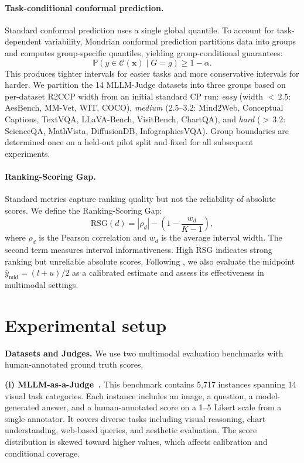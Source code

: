 \documentclass{article}
\begin{document}
\paragraph{Task-conditional conformal prediction.}
Standard conformal prediction uses a single global quantile. To account for task-dependent variability, Mondrian conformal prediction partitions data into groups and computes group-specific quantiles, yielding group-conditional guarantees:
\begin{equation}
\mathbb{P}(y \in \mathcal{C}(\mathbf{x}) \mid G = g) \geq 1 - \alpha.
\end{equation}
This produces tighter intervals for easier tasks and more conservative intervals for harder. We partition the 14 MLLM-Judge datasets into three groups based on per-dataset R2CCP width from an initial standard CP run: \emph{easy} (width ${<}\,2.5$: AesBench, MM-Vet, WIT, COCO), \emph{medium} ($2.5$--$3.2$: Mind2Web, Conceptual Captions, TextVQA, LLaVA-Bench, VisitBench, ChartQA), and \emph{hard} (${>}\,3.2$: ScienceQA, MathVista, DiffusionDB, InfographicsVQA). Group boundaries are determined once on a held-out pilot split and fixed for all subsequent experiments.

\paragraph{Ranking-Scoring Gap.}
Standard metrics capture ranking quality but not the reliability of absolute scores. We define the Ranking-Scoring Gap:
\begin{equation}
\text{RSG}(d) = |\rho_d| - \left(1 - \frac{w_d}{K - 1}\right),
\end{equation}
where $\rho_d$ is the Pearson correlation and $w_d$ is the average interval width. The second term measures interval informativeness. High RSG indicates strong ranking but unreliable absolute scores. Following \citet{sheng2025analyzing}, we also evaluate the midpoint $\hat{y}_{\text{mid}} = (l + u)/2$ as a calibrated estimate and assess its effectiveness in multimodal settings.

\section{Experimental setup}
\label{sec:setup}

\textbf{Datasets and Judges.}
We use two multimodal evaluation benchmarks with human-annotated ground truth scores.

\textbf{(i) MLLM-as-a-Judge~\citep{chen2024mllmasajudge}.}
This benchmark contains 5,717 instances spanning 14 visual task categories. Each instance includes an image, a question, a model-generated answer, and a human-annotated score on a 1--5 Likert scale from a single annotator. It covers diverse tasks including visual reasoning, chart understanding, web-based queries, and aesthetic evaluation. The score distribution is skewed toward higher values, which affects calibration and conditional coverage.
\end{document}
